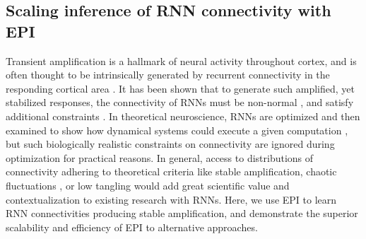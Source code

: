 \documentclass[11pt]{article}
\begin{document}
\subsection{Scaling inference of RNN connectivity with EPI} \label{results_LRRNN}
Transient amplification is a hallmark of neural activity throughout cortex, and is often thought to be intrinsically generated by recurrent connectivity in the responding cortical area \cite{murphy2009balanced, hennequin2014optimal, bondanelli2019population}.
It has been shown that to generate such amplified, yet stabilized responses, the connectivity of RNNs must be non-normal \cite{goldman2009memory, murphy2009balanced}, and satisfy additional constraints \cite{bondanelli2020coding}.
In theoretical neuroscience, RNNs are optimized and then examined to show how dynamical systems could execute a given computation \cite{sussillo2014neural, barak2017recurrent}, but such biologically realistic constraints on connectivity are  ignored during optimization for practical reasons.
In general, access to distributions of connectivity adhering to theoretical criteria like stable amplification, chaotic fluctuations \cite{sompolinsky1988chaos}, or low tangling \cite{russo2018motor} would add great scientific value and contextualization to existing research with RNNs.
Here, we use EPI to learn RNN connectivities producing stable amplification, and demonstrate the superior scalability and efficiency of EPI to alternative approaches.
\end{document}
